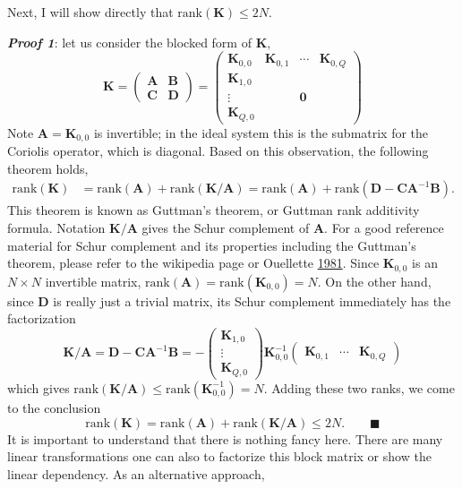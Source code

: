 Next, I will show directly that $\mathrm{rank}(\mathbf{K}) \leq 2N$.
\medskip

\noindent \textit{\textbf{Proof 1}}: let us consider the blocked form of $\mathbf{K}$,
\[
    \mathbf{K} = \begin{pmatrix}
        \mathbf{A} & \mathbf{B} \\ 
        \mathbf{C} & \mathbf{D}
    \end{pmatrix} = \left(\begin{array}{c|ccc}
        \mathbf{K}_{0,0} & \mathbf{K}_{0,1} & \cdots & \mathbf{K}_{0,Q} \\ 
        \hline
        \mathbf{K}_{1,0} & & & \\
        \vdots & & \mathbf{0} & \\ 
        \mathbf{K}_{Q,0} & & &
    \end{array}\right)
\]
Note $\mathbf{A} = \mathbf{K}_{0,0}$ is invertible; in the ideal system this is the submatrix for the Coriolis operator, which is diagonal. Based on this observation, the following theorem holds,
\begin{equation}
\begin{aligned}
    \mathrm{rank}(\mathbf{K}) &= \mathrm{rank}(\mathbf{A}) + \mathrm{rank}\left(\mathbf{K}/\mathbf{A}\right) = \mathrm{rank}(\mathbf{A}) + \mathrm{rank} \left(\mathbf{D} - \mathbf{C} \mathbf{A}^{-1} \mathbf{B}\right).
\end{aligned}
\end{equation}
This theorem is known as Guttman's theorem, or Guttman rank additivity formula. Notation $\mathbf{K}/\mathbf{A}$ gives the Schur complement of $\mathbf{A}$. For a good reference material for Schur complement and its properties including the Guttman's theorem, please refer to the wikipedia page or Ouellette \href{https://www.sciencedirect.com/science/article/pii/0024379581902329}{1981}.
Since $\mathbf{K}_{0,0}$ is an $N\times N$ invertible matrix, $\mathrm{rank}(\mathbf{A}) = \mathrm{rank}(\mathbf{K}_{0,0}) = N$. On the other hand, since $\mathbf{D}$ is really just a trivial matrix, its Schur complement immediately has the factorization
\[
    \mathbf{K}/\mathbf{A} = \mathbf{D} - \mathbf{C} \mathbf{A}^{-1} \mathbf{B} = - \begin{pmatrix}
        \mathbf{K}_{1,0} \\ 
        \vdots \\ 
        \mathbf{K}_{Q,0} 
    \end{pmatrix} \mathbf{K}_{0,0}^{-1}
    \begin{pmatrix}
        \mathbf{K}_{0,1} & \cdots & \mathbf{K}_{0,Q}
    \end{pmatrix}
\]
which gives $\mathrm{rank}(\mathbf{K}/\mathbf{A}) \leq \mathrm{rank}(\mathbf{K}_{0,0}^{-1}) = N$. Adding these two ranks, we come to the conclusion
\begin{equation}
    \mathrm{rank}(\mathbf{K}) = \mathrm{rank}(\mathbf{A}) + \mathrm{rank}(\mathbf{K}/\mathbf{A}) \leq 2N. \qquad \blacksquare
\end{equation}
It is important to understand that there is nothing fancy here. There are many linear transformations one can also to factorize this block matrix or show the linear dependency. As an alternative approach, 
\medskip

